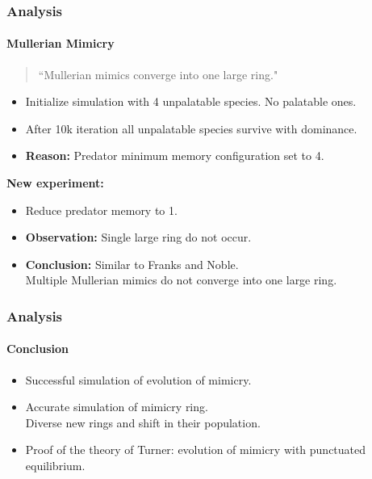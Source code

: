 \frame
{
	\frametitle{Analysis}
	\framesubtitle{Mullerian Mimicry}

	\begin{quote}
		``Mullerian mimics converge into one large ring."
	\end{quote}
	
	\begin{itemize}
		\item Initialize simulation with 4 unpalatable species. No palatable ones.
		\item After 10k iteration all unpalatable species survive with dominance.
		\item \textbf{Reason:} Predator minimum memory configuration set to 4.
	\end{itemize}
	
	\textbf{New experiment:}
	\begin{itemize}
		\item Reduce predator memory to 1.\\
		\item \textbf{Observation:} Single large ring do not occur. 
		\item \textbf{Conclusion:} Similar to Franks and Noble.\\
		Multiple Mullerian mimics do not converge into one large ring.
	\end{itemize}	

}

\frame
{
	\frametitle{Analysis}
	\framesubtitle{Conclusion}

	\begin{itemize}
		\item Successful simulation of evolution of mimicry.
		\item Accurate simulation of mimicry ring.\\
		Diverse new rings and shift in their population.
		\item Proof of the theory of Turner: evolution of mimicry with punctuated equilibrium.
	\end{itemize}
}
